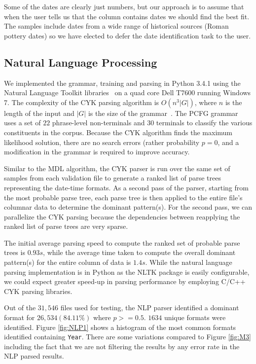 Some of the dates are clearly just numbers, but our approach is to assume that when the user tells us that the column contains dates we should find the best fit. 
The samples include dates from a wide range of historical sources (\eg Roman pottery dates) so we have elected to defer the date identification task to the user.

\subsection{Natural Language Processing}

We implemented the grammar, training and parsing in Python 3.4.1 using the Natural Language Toolkit libraries~\cite{nltk} on a quad core Dell T7600 running Windows 7. The complexity of the CYK parsing algorithm is $O(n^{3}|G|)$, where $n$ is the length of the input and $|G|$ is the size of the grammar~\cite{Younger67}. The PCFG grammar uses a set of $22$ phrase-level non-terminals and $30$ terminals to classify the various constituents in the corpus. Because the CYK algorithm finds the maximum likelihood solution, there are no search errors (rather probability $p = 0$, and a modification in the grammar is required to improve accuracy.

Similar to the MDL algorithm, the CYK parser is run over the same set of samples from each validation file to generate a ranked list of parse trees representing the date-time formats. As a second pass of the parser, starting from the most probable parse tree, each parse tree is then applied to the entire file's columnar data to determine the dominant pattern(s). For the second pass, we can parallelize the CYK parsing because the dependencies between reapplying the ranked list of parse trees are very sparse.

The initial average parsing speed to compute the ranked set of probable parse trees is $0.93s$, while the average time taken to compute the overall dominant pattern(s) for the entire column of data is $1.4s$. While the natural language parsing implementation is in Python as the NLTK package is easily configurable, we could expect greater speed-up in parsing performance by employing C/C++ CYK parsing libraries.


Out of the $31,546$ files used for testing, the NLP parser identified a dominant format for $26, 534 (84.11\%)$ where $p >= 0.5$. $1634$ unique formats were identified. Figure \ref{fig:NLP1} shows a histogram of the most common formats identified containing \texttt{Year}. There are some variations compared to Figure \ref{fig:M3} including the fact that we are not filtering the results by any error rate in the NLP parsed results.

